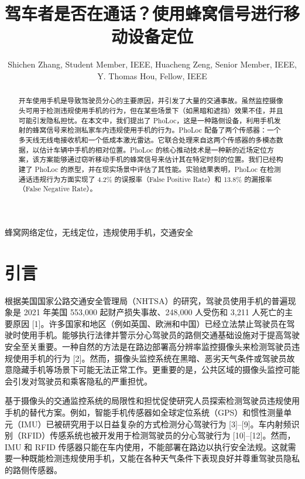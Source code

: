 \documentclass[journal, onecolumn]{IEEEtran}
\begin{document}
\title{驾车者是否在通话？使用蜂窝信号进行移动设备定位}

\author{Shichen Zhang, Student Member, IEEE, Huacheng Zeng, Senior Member, IEEE, \\ Y. Thomas Hou, Fellow, IEEE}

\maketitle

\begin{abstract}
开车使用手机是导致驾驶员分心的主要原因，并引发了大量的交通事故。虽然监控摄像头可用于检测违规使用手机的行为，但在某些场景下（如黑暗和遮挡）效果不佳，并且可能引发隐私担忧。在本文中，我们提出了 PhoLoc，这是一种路侧设备，利用手机发射的蜂窝信号来检测私家车内违规使用手机的行为。PhoLoc 配备了两个传感器：一个多天线无线电接收机和一个低成本激光雷达。它联合处理来自这两个传感器的多模态数据，以估计车辆中手机的相对位置。PhoLoc 的核心推动技术是一种新的近场定位方案，该方案能够通过窃听移动手机的蜂窝信号来估计其在特定时刻的位置。我们已经构建了 PhoLoc 的原型，并在现实场景中评估了其性能。实验结果表明，PhoLoc 在检测通话违规行为方面实现了 4.2\% 的误报率（False Positive Rate）和 13.8\% 的漏报率（False Negative Rate）。
\end{abstract}

\begin{IEEEkeywords}
蜂窝网络定位，无线定位，违规使用手机，交通安全
\end{IEEEkeywords}

\section{引言}

根据美国国家公路交通安全管理局（NHTSA）的研究，驾驶员使用手机的普遍现象是 2021 年美国 553,000 起财产损失事故、248,000 人受伤和 3,211 人死亡的主要原因 [1]。许多国家和地区（例如英国、欧洲和中国）已经立法禁止驾驶员在驾驶时使用手机。能够执行法律并警示分心驾驶员的路侧交通基础设施对于提高驾驶安全至关重要。一种自然的方法是在路边部署高分辨率监控摄像头来检测驾驶员违规使用手机的行为 [2]。然而，摄像头监控系统在黑暗、恶劣天气条件或驾驶员故意隐藏手机等场景下可能无法正常工作。更重要的是，公共区域的摄像头监控可能会引发对驾驶员和乘客隐私的严重担忧。

基于摄像头的交通监控系统的局限性和担忧促使研究人员探索检测驾驶员违规使用手机的替代方案。例如，智能手机传感器如全球定位系统（GPS）和惯性测量单元（IMU）已被研究用于以日益复杂的方式检测分心驾驶行为 [3]–[9]。车内射频识别（RFID）传感系统也被开发用于检测驾驶员的分心驾驶行为 [10]–[12]。然而，IMU 和 RFID 传感器只能在车内使用，不能部署在路边以执行安全法规。这就需要一种既能检测违规使用手机，又能在各种天气条件下表现良好并尊重驾驶员隐私的路侧传感器。
\end{document}
